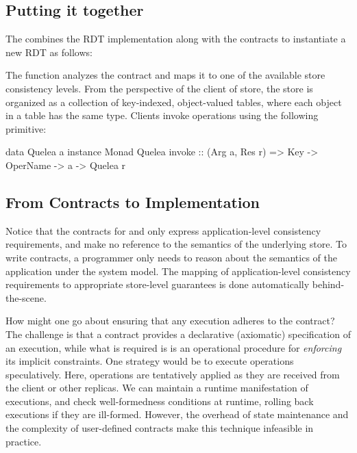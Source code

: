 \subsection{Putting it together}

The combines the RDT implementation along with the contracts to instantiate a
new RDT as follows:


\noindent The function  analyzes the contract and maps it to one of the
available store consistency levels. From the perspective of the client of \name
store, the store is organized as a collection of key-indexed, object-valued
tables, where each object in a table has the same type. Clients invoke
operations using the following primitive:

\begin{codehaskell}
data Quelea a
instance Monad Quelea
invoke :: (Arg a, Res r)
			 => Key -> OperName -> a -> Quelea r
\end{codehaskell}

\subsection{From Contracts to Implementation}

Notice that the contracts for  and  only express
application-level consistency requirements, and make no reference to the
semantics of the underlying store. To write contracts, a programmer only needs
to reason about the semantics of the application under the \name system model.
The mapping of application-level consistency requirements to appropriate
store-level guarantees is done automatically behind-the-scene.

How might one go about ensuring that any execution adheres to the contract? The
challenge is that a contract provides a declarative (axiomatic) specification
of an execution, while what is required is is an operational procedure for
\emph{enforcing} its implicit constraints. One strategy would be to execute
operations speculatively.  Here, operations are tentatively applied as they are
received from the client or other replicas. We can maintain a runtime
manifestation of executions, and check well-formedness conditions at runtime,
rolling back executions if they are ill-formed. However, the overhead of state
maintenance and the complexity of user-defined contracts make this technique
infeasible in practice.

